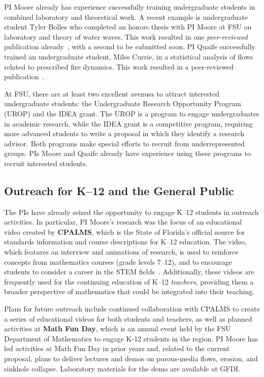 \documentclass[11pt]{article}
\begin{document}
PI Moore already has experience successfully training undergraduate students in combined laboratory and theoretical work. A recent example is undergraduate student Tyler Bolles who completed an honors thesis with PI Moore at FSU on laboratory and theory of water waves. This work resulted in one {\em peer-reviewed} publication already~\cite{Bolles2019}, with a second to be submitted soon. PI Quaife successfully trained an undergraduate student, Miles Currie, in a statistical analysis of flows related to prescribed fire dynamics.  This work resulted in a peer-reviewed publication~\cite{cur-spe-hie-obr-goo-qua2018}.

At FSU, there are at least two excellent avenues to attract interested undergraduate students:  the Undergraduate Research Opportunity Program (UROP) and the IDEA grant. The UROP is a program to engage undergraduates in academic research, while the IDEA grant is a competitive program, requiring more advanced students to write a proposal in which they identify a research advisor. Both programs make special efforts to recruit from underrepresented groups. PIs Moore and Quaife already have experience using these programs to recruit interested students.

\subsection{Outreach for K--12 and the General Public}
The PIs have already seized the opportunity to engage K--12 students in outreach activities. In particular, PI Moore's research was the focus of an educational video created by {\bf CPALMS}, which is the State of Florida's official source for standards information and course descriptions for K--12 education. The video, which features an interview and animations of research, is used to reinforce concepts from mathematics courses (grade levels 7--12), and to encourage students to consider a career in the STEM fields~\cite{CPALMS}. Additionally, these videos are frequently used for the continuing education of K--12 {\em teachers}, providing them a broader perspective of mathematics that could be integrated into their teaching.
 
Plans for future outreach include continued collaboration with CPALMS to create a series of educational videos for both students and teachers, as well as planned activities at {\bf Math Fun Day}, which is an annual event held by the FSU Department of Mathematics to engage K-12 students in the region. PI Moore has led activities at Math Fun Day in prior years and, related to the current proposal, plans to deliver lectures and demos on porous-media flows, erosion, and sinkhole collapse. Laboratory materials for the demo are available at GFDI.
\end{document}

